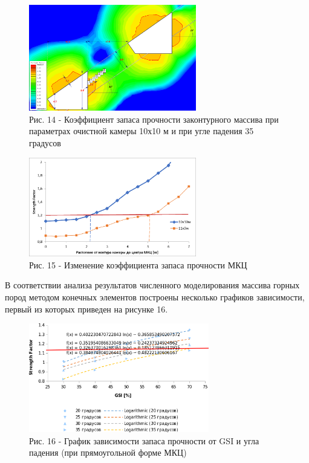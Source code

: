 \begin{figure}[H]
	\centering
	\includegraphics[width=0.65\textwidth]{assets/294}
	\caption*{Рис. 14 - Коэффициент запаса прочности законтурного массива при
параметрах очистной камеры 10х10 м и при угле падения 35 градусов}
\end{figure}

\begin{figure}[H]
	\centering
	\includegraphics[width=0.65\textwidth]{assets/295}
	\caption*{Рис. 15 - Изменение коэффициента запаса прочности МКЦ}
\end{figure}

В соответствии анализа результатов численного моделирования массива
горных пород методом конечных элементов построены несколько графиков
зависимости, первый из которых приведен на рисунке 16.

\begin{figure}[H]
	\centering
	\includegraphics[width=0.7\textwidth]{assets/295.1}
	\caption*{Рис. 16 - График зависимости запаса прочности от GSI и угла падения (при прямоугольной форме МКЦ)}
\end{figure}

